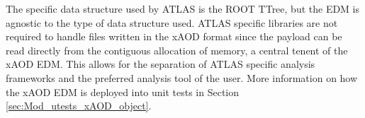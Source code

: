 The specific data structure used by ATLAS is the ROOT TTree, but the EDM is agnostic to the type of data structure used. 
ATLAS specific libraries are not required to handle files written in the xAOD format since the payload can be read directly from the contiguous allocation of memory, a central tenent of the xAOD EDM.
This allows for the separation of ATLAS specific analysis frameworks and the preferred analysis tool of the user.
More information on how the xAOD EDM is deployed into unit tests in Section \ref{sec:Mod_utests_xAOD_object}.


